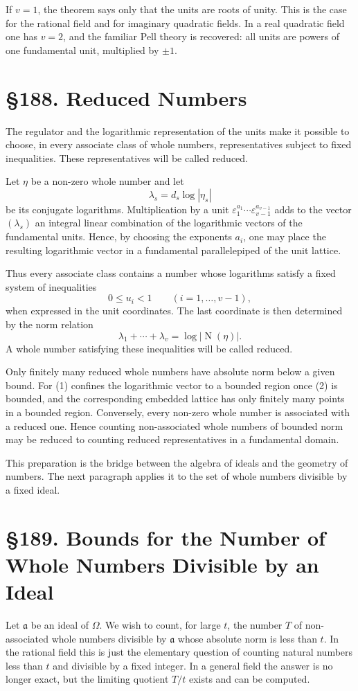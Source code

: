 \documentclass[12pt,a4paper]{article}
\newcommand{\webersection}[2]{\clearpage\section*{\S #1. #2}}
\newcommand{\ideala}{\mathfrak a}
\newcommand{\N}{\operatorname{N}}
\begin{document}
If \(v=1\), the theorem says only that the units are roots of unity.  This is the case for the rational field and for imaginary quadratic fields.  In a real quadratic field one has \(v=2\), and the familiar Pell theory is recovered: all units are powers of one fundamental unit, multiplied by \(\pm1\).

\webersection{188}{Reduced Numbers}

The regulator and the logarithmic representation of the units make it possible to choose, in every associate class of whole numbers, representatives subject to fixed inequalities.  These representatives will be called reduced.

Let \(\eta\) be a non-zero whole number and let
\[
  \lambda_s=d_s\log|\eta_s|
\]
be its conjugate logarithms.  Multiplication by a unit \(\varepsilon_1^{a_1}\cdots\varepsilon_{v-1}^{a_{v-1}}\)
adds to the vector \((\lambda_s)\) an integral linear combination of the logarithmic vectors of the fundamental units.  Hence, by choosing the exponents \(a_i\), one may place the resulting logarithmic vector in a fundamental parallelepiped of the unit lattice.

Thus every associate class contains a number whose logarithms satisfy a fixed system of inequalities
\[
  0\le u_i<1\qquad (i=1,
\ldots,v-1),
\tag{1}
\]
when expressed in the unit coordinates.  The last coordinate is then determined by the norm relation
\[
  \lambda_1+\cdots+\lambda_v=
\log|
\N(\eta)|.
\tag{2}
\]
A whole number satisfying these inequalities will be called reduced.

Only finitely many reduced whole numbers have absolute norm below a given bound.  For (1) confines the logarithmic vector to a bounded region once (2) is bounded, and the corresponding embedded lattice has only finitely many points in a bounded region.  Conversely, every non-zero whole number is associated with a reduced one.  Hence counting non-associated whole numbers of bounded norm may be reduced to counting reduced representatives in a fundamental domain.

This preparation is the bridge between the algebra of ideals and the geometry of numbers.  The next paragraph applies it to the set of whole numbers divisible by a fixed ideal.

\webersection{189}{Bounds for the Number of Whole Numbers Divisible by an Ideal}

Let \(\ideala\) be an ideal of \(\Omega\).  We wish to count, for large \(t\), the number \(T\) of non-associated whole numbers divisible by \(\ideala\) whose absolute norm is less than \(t\).  In the rational field this is just the elementary question of counting natural numbers less than \(t\) and divisible by a fixed integer.  In a general field the answer is no longer exact, but the limiting quotient \(T/t\) exists and can be computed.
\end{document}
